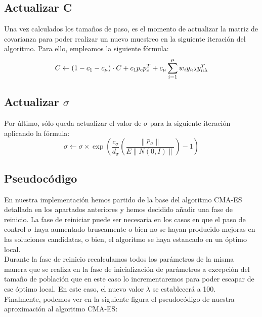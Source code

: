 \subsection{Actualizar C}
Una vez calculados los tamaños de paso, es el momento de actualizar la matriz de covarianza para poder realizar un nuevo muestreo en la siguiente iteración del algoritmo. Para ello, empleamos la siguiente fórmula:
\begin{equation} \label{eq:5}
    C \leftarrow (1 - c_{1} - c_{\mu})\cdot C + c_{1}p_{c}p_{c}^{T} + c_{\mu} \sum_{i=1}^{\mu} w_{i}y_{i:\lambda}y_{i:\lambda}^{T} \\
\end{equation}

\subsection{Actualizar $ \sigma $}
Por último, sólo queda actualizar el valor de $\sigma$ para la siguiente iteración aplicando la fórmula:  
\begin{equation} \label{eq:6}
     \sigma\leftarrow\sigma \times \exp(\frac{c_{\sigma}}{d_{\sigma}} (\frac{\left \| p_{\sigma}\right\|}{E \left \|N(0, I)\right \|}) - 1)
\end{equation}

\subsection{Pseudocódigo}

En nuestra implementación hemos partido de la base del algoritmo CMA-ES detallada en los apartados anteriores y hemos decidido añadir una fase de reinicio. La fase de reiniciar puede ser necesaria en los casos en que el paso de control $\sigma$ haya aumentado bruscamente o bien no se hayan producido mejoras en las soluciones candidatas, o bien, el algoritmo se haya estancado en un óptimo local. \\

Durante la fase de reinicio recalculamos todos los parámetros de la misma manera que se realiza en la fase de inicialización de parámetros a excepción del tamaño de población que en este caso lo incrementaremos para poder escapar de ese óptimo local. En este caso, el nuevo valor $\lambda$ se establecerá a 100. \\

Finalmente, podemos ver en la siguiente figura el pseudocódigo de nuestra aproximación al algoritmo CMA-ES:

